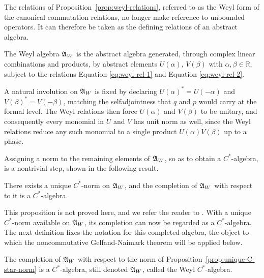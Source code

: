 	\noindent The relations of Proposition~\ref{prop:weyl-relations}, referred to as the Weyl form of the canonical commutation relations, no longer make reference to unbounded operators. It can therefore be taken as the defining relations of an abstract algebra.
	
	\begin{definition}
		\label{def:weyl-algebra}
		The Weyl algebra $\mathfrak{A}_W$ is the abstract algebra generated, through complex linear combinations and products, by abstract elements $U(\alpha)$, $V(\beta)$ with $\alpha,\beta \in \mathbb{R}$, subject to the relations Equation \eqref{eq:weyl-rel-1} and Equation \eqref{eq:weyl-rel-2}.
	\end{definition}
	
	\begin{remark}
		A natural involution on $\mathfrak{A}_W$ is fixed by declaring $U(\alpha)^* = U(-\alpha)$ and $V(\beta)^* = V(-\beta)$, matching the selfadjointness that $q$ and $p$ would carry at the formal level. The Weyl relations then force $U(\alpha)$ and $V(\beta)$ to be unitary, and consequently every monomial in $U$ and $V$ has unit norm as well, since the Weyl relations reduce any such monomial to a single product $U(\alpha)V(\beta)$ up to a phase.
	\end{remark}
	
	\noindent Assigning a norm to the remaining elements of $\mathfrak{A}_W$, so as to obtain a $C^*$-algebra, is a nontrivial step, shown in the following result.
	
	\begin{proposition}
		\label{prop:unique-C-star-norm}
		There exists a unique $C^*$-norm on $\mathfrak{A}_W$, and the completion of $\mathfrak{A}_W$ with respect to it is a $C^*$-algebra.
	\end{proposition}
	
	\noindent This proposition is not proved here, and we refer the reader to \cite[Theorem 5.2.8]{bratteliOperatorAlgebrasQuantum1981}. With a unique $C^*$-norm available on $\mathfrak{A}_W$, its completion can now be regarded as a $C^*$-algebra. The next definition fixes the notation for this completed algebra, the object to which the noncommutative Gelfand-Naimark theorem will be applied below.
	
	\begin{definition}
		\label{def:weyl-c-star-algebra}
		The completion of $\mathfrak{A}_W$ with respect to the norm of Proposition~\ref{prop:unique-C-star-norm} is a $C^*$-algebra, still denoted $\mathfrak{A}_W$, called the Weyl $C^*$-algebra.
	\end{definition}
	
